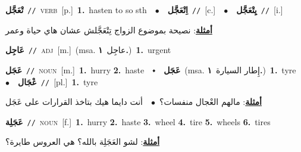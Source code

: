 \documentclass[10pt,a4paper,twoside]{article} %
\begin{document}
\begin{multicols}{2}
{\setlength\topsep{0pt}\textbf{\foreignlanguage{arabic}{تْعَجَّل}}\ {\color{gray}\texttt{//}\color{black}}\ \textsc{verb}\ [p.]\ \textbf{1.}~hasten to so sth\ \ $\bullet$\ \ \setlength\topsep{0pt}\textbf{\foreignlanguage{arabic}{اِتْعَجَّل}}\ {\color{gray}\texttt{//}\color{black}}\ [c.]\ \ $\bullet$\ \ \setlength\topsep{0pt}\textbf{\foreignlanguage{arabic}{يِتْعَجَّل}}\ {\color{gray}\texttt{//}\color{black}}\ [i.]\  \begin{flushright}\color{gray}\foreignlanguage{arabic}{\textbf{\underline{\foreignlanguage{arabic}{أمثلة}}}: نصيحة بموضوع الزواج تِتْعَجَّلش عشان هاي حياة وعمر}\end{flushright}\color{black}} \vspace{2mm}

{\setlength\topsep{0pt}\textbf{\foreignlanguage{arabic}{عَاجِل}}\ {\color{gray}\texttt{//}\color{black}}\ \textsc{adj}\ [m.]\ \color{gray}(msa. \foreignlanguage{arabic}{عاجِل}~\foreignlanguage{arabic}{\textbf{١.}})\color{black}\ \textbf{1.}~urgent\ } \vspace{2mm}

{\setlength\topsep{0pt}\textbf{\foreignlanguage{arabic}{عَجَل}}\ {\color{gray}\texttt{//}\color{black}}\ \textsc{noun}\ [m.]\ \textbf{1.}~hurry  \textbf{2.}~haste\ \ $\smblkdiamond$\ \ \setlength\topsep{0pt}\textbf{\foreignlanguage{arabic}{عَجَل}}\ \color{gray}(msa. \foreignlanguage{arabic}{إِطار السيارة}~\foreignlanguage{arabic}{\textbf{١.}})\color{black}\ \textbf{1.}~tyre\ \ $\bullet$\ \ \setlength\topsep{0pt}\textbf{\foreignlanguage{arabic}{عْجَال}}\ {\color{gray}\texttt{//}\color{black}}\ [pl.]\ \textbf{1.}~tyre\  \begin{flushright}\color{gray}\foreignlanguage{arabic}{\textbf{\underline{\foreignlanguage{arabic}{أمثلة}}}: مالهم العْجال منفسات؟\ $\bullet$\ \  أنت دايما هيك بتاخذ القرارات على عَجَل}\end{flushright}\color{black}} \vspace{2mm}

{\setlength\topsep{0pt}\textbf{\foreignlanguage{arabic}{عَجَلِة}}\ {\color{gray}\texttt{//}\color{black}}\ \textsc{noun}\ [f.]\ \textbf{1.}~hurry  \textbf{2.}~haste  \textbf{3.}~wheel  \textbf{4.}~tire  \textbf{5.}~wheels  \textbf{6.}~tires\  \begin{flushright}\color{gray}\foreignlanguage{arabic}{\textbf{\underline{\foreignlanguage{arabic}{أمثلة}}}: لشو العَجَلِة بالله؟ هي العروس طايرة؟}\end{flushright}\color{black}} \vspace{2mm}


\end{multicols}
\end{document}

